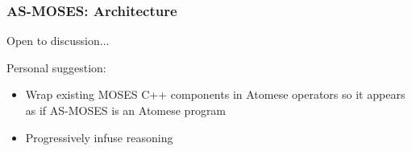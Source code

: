 \documentclass{beamer}
\begin{document}
\begin{frame}
  \frametitle{AS-MOSES: Architecture}

  Open to discussion...\\[0.5cm]

  \pause

  Personal suggestion:
  \begin{itemize}
  \item Wrap existing MOSES C++ components in Atomese operators so it
    appears as if \alert{AS-MOSES is an Atomese program}
  \item Progressively \alert{infuse reasoning}
  \end{itemize}

\end{frame}
\end{document}
